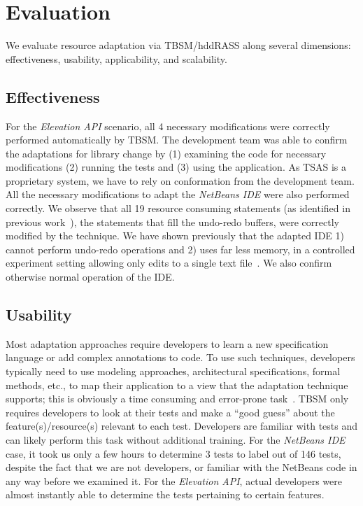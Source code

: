 \section{Evaluation}
We evaluate resource adaptation via TBSM/hddRASS along several dimensions: effectiveness, usability, applicability, and scalability.

\subsection{Effectiveness}
For the \textit{Elevation API} scenario, all 4 necessary modifications were correctly performed automatically by TBSM. The development team was able to confirm the adaptations for library change by (1) examining the code for necessary modifications (2) running the tests and (3) using the application. As TSAS is a proprietary system, we have to rely on conformation from the development team. All the necessary modifications to adapt the \textit{NetBeans IDE} were also performed correctly. We observe that all 19 resource consuming statements (as identified in previous work~\cite{christi2018qrs}), the statements that fill the undo-redo buffers, were correctly modified by the technique. We have shown previously that the adapted IDE 1) cannot perform undo-redo operations and 2) uses far less memory, in a controlled experiment setting allowing only edits to a single text file~\cite{christi2017saso}. We also confirm otherwise normal operation of the IDE.

\subsection{Usability}
Most adaptation approaches require developers to learn a new specification language or add complex annotations to code. To use such techniques, developers typically need to use modeling approaches, architectural specifications, formal methods, etc., to map their application to a view that the adaptation technique supports; this is obviously a time consuming and error-prone task~\cite{salehie2009selfadaptive, krupitzer2015a}. TBSM only requires developers to look at their tests and make a ``good guess'' about the feature(s)/resource(s) relevant to each test. Developers are familiar with tests and can likely perform this task without additional training. For the \textit{NetBeans IDE} case, it took us only a few hours to determine 3 tests to label out of 146 tests, despite the fact that we are not developers, or familiar with the NetBeans code in any way before we examined it. For the \textit{Elevation API}, actual developers were almost instantly able to determine the tests pertaining to certain features.

